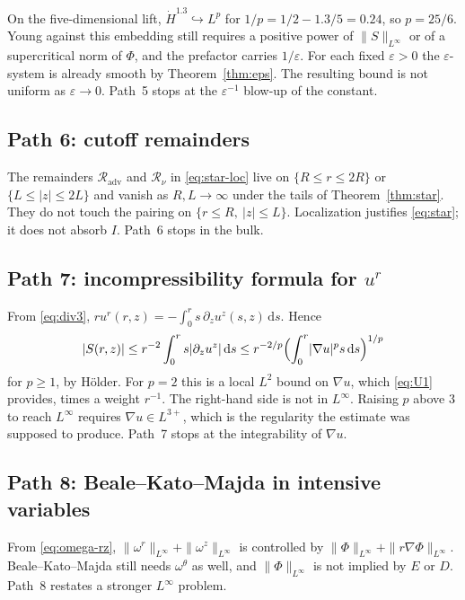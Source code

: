 \documentclass[11pt]{article}
\theoremstyle{definition}
\newcommand{\eps}{\varepsilon}
\newcommand{\dd}{\mathrm{d}}
\newcommand{\ur}{u^{r}}
\newcommand{\uz}{u^{z}}
\newcommand{\Ph}{\Phi}
\newcommand{\Hdot}{\dot{H}}
\newcommand{\Lint}{L^{\infty}}
\newcommand{\norm}[2]{\|#1\|_{#2}}
\newcommand{\abs}[1]{\lvert#1\rvert}
\begin{document}
On the five-dimensional lift,
\(\Hdot^{1.3}\hookrightarrow L^{p}\) for
\(1/p=1/2-1.3/5=0.24\), so \(p=25/6\).
Young against this embedding still requires a positive power of
\(\norm{S}{\Lint}\) or of a supercritical norm of \(\Ph\), and the
prefactor carries \(1/\eps\).
For each fixed \(\eps>0\) the \(\eps\)-system is already smooth by
Theorem~\ref{thm:eps}. The resulting bound is not uniform as
\(\eps\to 0\).
Path~5 stops at the \(\eps^{-1}\) blow-up of the constant.

\subsection{Path 6: cutoff remainders}

The remainders \(\mathcal{R}_{\mathrm{adv}}\) and \(\mathcal{R}_{\nu}\)
in \eqref{eq:star-loc} live on \(\{R\le r\le 2R\}\) or
\(\{L\le\abs{z}\le 2L\}\) and vanish as \(R,L\to\infty\) under the
tails of Theorem~\ref{thm:star}.
They do not touch the pairing on \(\{r\le R,\ \abs{z}\le L\}\).
Localization justifies \eqref{eq:star}; it does not absorb \(I\).
Path~6 stops in the bulk.

\subsection{Path 7: incompressibility formula for \(\ur\)}

From \eqref{eq:div3},
\(r\ur(r,z)=-\int_0^r s\,\partial_z\uz(s,z)\,\dd s\).
Hence
\[
  \abs{S(r,z)}
  \le r^{-2}\int_0^r s\abs{\partial_z\uz}\,\dd s
  \le r^{-2/p}\Bigl(\int_0^r\abs{\nabla u}^p s\,\dd s\Bigr)^{1/p}
\]
for \(p\ge 1\), by H\"older.
For \(p=2\) this is a local \(L^2\) bound on \(\nabla u\), which
\eqref{eq:U1} provides, times a weight \(r^{-1}\). The right-hand side
is not in \(\Lint\). Raising \(p\) above \(3\) to reach \(\Lint\)
requires \(\nabla u\in L^{3+}\), which is the regularity the estimate
was supposed to produce.
Path~7 stops at the integrability of \(\nabla u\).

\subsection{Path 8: Beale--Kato--Majda in intensive variables}

From \eqref{eq:omega-rz},
\(\norm{\omega^r}{\Lint}+\norm{\omega^z}{\Lint}\) is controlled by
\(\norm{\Ph}{\Lint}+\norm{r\nabla\Ph}{\Lint}\).
Beale--Kato--Majda still needs \(\omega^\theta\) as well, and
\(\norm{\Ph}{\Lint}\) is not implied by \(E\) or \(D\).
Path~8 restates a stronger \(\Lint\) problem.
\end{document}
